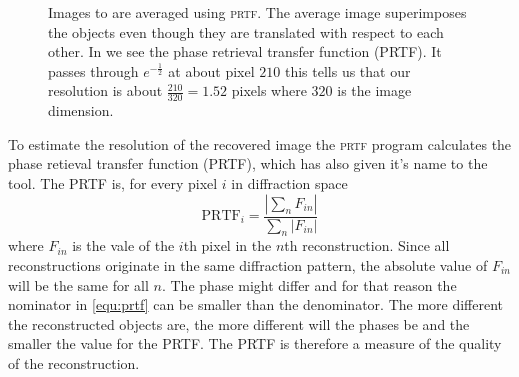 \documentclass[11pt,a4paper]{article}
\newcommand{\hawk}[1]{\textsc{#1}}
\begin{document}
\begin{figure}
  \caption{Images  to  are averaged using \hawk{prtf}. The average image  superimposes the objects even though they are translated with respect to each other. In  we see the phase retrieval transfer function (PRTF). It passes through $e^{-\frac{1}{2}}$ at about pixel $210$ this tells us that our resolution is about $\frac{210}{320} = 1.52$ pixels where $320$ is the image dimension.}
  \label{fig:prtf}
\end{figure}

To estimate the resolution of the recovered image the \hawk{prtf} program calculates the phase retieval transfer function (PRTF), which has also given it's name to the tool. The PRTF is, for every pixel $i$ in diffraction space
\begin{equation}\label{equ:prtf}
  \mathrm{PRTF}_i = \frac{\left| \sum_n F_{in} \right|}{\sum_n \left| F_{in} \right|}
\end{equation}
where $F_{in}$ is the vale of the $i$th pixel in the $n$th reconstruction. Since all reconstructions originate in the same diffraction pattern, the absolute value of $F_{in}$ will be the same for all $n$. The phase might differ and for that reason the nominator in \ref{equ:prtf} can be smaller than the denominator. The more different the reconstructed objects are, the more different will the phases be and the smaller the value for the PRTF. The PRTF is therefore a measure of the quality of the reconstruction.
\end{document}
